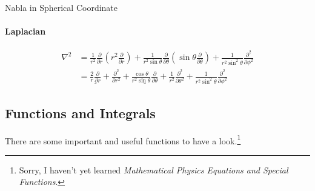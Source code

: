 \documentclass{article}
\newcommand{\pd}[2]{\frac{\partial #1}{\partial #2}}%
\newcommand{\spd}[2]{\frac{\partial^2 #1}{\partial #2^2}}
\newcommand{\kh}[1]{\left(#1\right)}
\begin{document}
\begin{example}{Nabla in Spherical Coordinate}{}
	\paragraph{Laplacian}
	\begin{align*}
		\nabla^2 & =\frac1{r^2}\pd{}r\kh{r^2\pd{}r}+\frac1{r^2\sin\theta}\pd{}\theta\kh{\sin\theta\pd{}\theta}+\frac1{r^2\sin^2\theta}\spd{}\phi                        \\
		         & =\underline{\frac2r\pd{}r}+\spd{}r+\underline{\frac{\cos\theta}{r^2\sin\theta}\pd{}\theta}+\frac1{r^2}\spd{}\theta+\frac1{r^2\sin^2\theta}\spd{}\phi
	\end{align*}
\end{example}
\subsection{Functions and Integrals}
There are some important and useful functions to have a look.\footnote{Sorry, I haven't yet learned \textit{Mathematical Physics Equations and Special Functions}.}
\setcounter{subsubsection}{-1}
\end{document}
